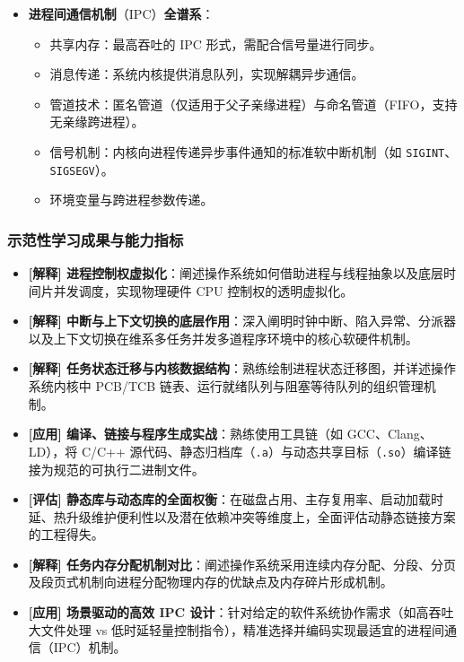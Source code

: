 \begin{itemize}
    \item \textbf{进程间通信机制}（IPC）\textbf{全谱系}：
    \begin{itemize}\setlength{\itemsep}{0pt}\setlength{\parskip}{0pt}
        \item 共享内存：最高吞吐的 IPC 形式，需配合信号量进行同步。
        \item 消息传递：系统内核提供消息队列，实现解耦异步通信。
        \item 管道技术：匿名管道（仅适用于父子亲缘进程）与命名管道（FIFO，支持无亲缘跨进程）。
        \item 信号机制：内核向进程传递异步事件通知的标准软中断机制（如 \texttt{SIGINT}、\texttt{SIGSEGV}）。
        \item 环境变量与跨进程参数传递。
    \end{itemize}
\end{itemize}

\subsubsection{示范性学习成果与能力指标}
\begin{itemize}\setlength{\itemsep}{0pt}\setlength{\parskip}{0pt}
    \item \textbf{[解释] 进程控制权虚拟化}：阐述操作系统如何借助进程与线程抽象以及底层时间片并发调度，实现物理硬件 CPU 控制权的透明虚拟化。
    \item \textbf{[解释] 中断与上下文切换的底层作用}：深入阐明时钟中断、陷入异常、分派器以及上下文切换在维系多任务并发多道程序环境中的核心软硬件机制。
    \item \textbf{[解释] 任务状态迁移与内核数据结构}：熟练绘制进程状态迁移图，并详述操作系统内核中 PCB/TCB 链表、运行就绪队列与阻塞等待队列的组织管理机制。
    \item \textbf{[应用] 编译、链接与程序生成实战}：熟练使用工具链（如 GCC、Clang、LD），将 C/C++ 源代码、静态归档库（\texttt{.a}）与动态共享目标（\texttt{.so}）编译链接为规范的可执行二进制文件。
    \item \textbf{[评估] 静态库与动态库的全面权衡}：在磁盘占用、主存复用率、启动加载时延、热升级维护便利性以及潜在依赖冲突等维度上，全面评估动静态链接方案的工程得失。
    \item \textbf{[解释] 任务内存分配机制对比}：阐述操作系统采用连续内存分配、分段、分页及段页式机制向进程分配物理内存的优缺点及内存碎片形成机制。
    \item \textbf{[应用] 场景驱动的高效 IPC 设计}：针对给定的软件系统协作需求（如高吞吐大文件处理 vs 低时延轻量控制指令），精准选择并编码实现最适宜的进程间通信（IPC）机制。
\end{itemize}

